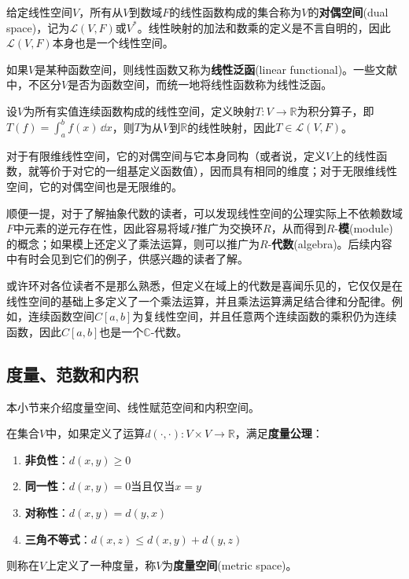 \begin{definition}[对偶空间]
    给定线性空间$V$，所有从$V$到数域$F$的线性函数构成的集合称为$V$的\textbf{对偶空间}(dual space)，记为$\mathcal{L}(V,F)$或$V^*$。线性映射的加法和数乘的定义是不言自明的，因此$\mathcal{L}(V,F)$本身也是一个线性空间。

    如果$V$是某种函数空间，则线性函数又称为\textbf{线性泛函}(linear functional)。一些文献中，不区分$V$是否为函数空间，而统一地将线性函数称为线性泛函。
\end{definition}
\begin{example}
    设$V$为所有实值连续函数构成的线性空间，定义映射$T:V\to \mathbb{R}$为积分算子，即$T(f)=\int_{a}^{b}f(x)\,\dd x$，则$T$为从$V$到$\mathbb{R}$的线性映射，因此$T\in \mathcal{L}(V,F)$。
\end{example}

对于有限维线性空间，它的对偶空间与它本身同构（或者说，定义$V$上的线性函数，就等价于对它的一组基定义函数值），因而具有相同的维度；对于无限维线性空间，它的对偶空间也是无限维的。

顺便一提，对于了解抽象代数的读者，可以发现线性空间的公理实际上不依赖数域$F$中元素的逆元存在性，因此容易将域$F$推广为交换环$R$，从而得到$R$-\textbf{模}(module)的概念；如果模上还定义了乘法运算，则可以推广为$R$-\textbf{代数}(algebra)。后续内容中有时会见到它们的例子，供感兴趣的读者了解。

\begin{example}
    或许环对各位读者不是那么熟悉，但定义在域上的代数是喜闻乐见的，它仅仅是在线性空间的基础上多定义了一个乘法运算，并且乘法运算满足结合律和分配律。例如，连续函数空间$C[a,b]$为复线性空间，并且任意两个连续函数的乘积仍为连续函数，因此$C[a,b]$也是一个$\mathbb{C}$-代数。
\end{example}

\subsection{度量、范数和内积}\label{sub:measurement}

本小节来介绍度量空间、线性赋范空间和内积空间\cite{linear_algebra}。
\begin{definition}[度量]
    在集合$V$中，如果定义了运算$d(\cdot,\cdot):V\times V\rightarrow \mathbb{R}$，满足\textbf{度量公理}：
    \begin{enumerate}
        \item \textbf{非负性}：$d(x, y) \geq 0$
        \item \textbf{同一性}：$d(x, y) = 0$当且仅当$x = y$
        \item \textbf{对称性}：$d(x, y) = d(y, x)$
        \item \textbf{三角不等式}：$d(x, z) \leq d(x, y) + d(y, z)$
    \end{enumerate}
    则称在$V$上定义了一种度量，称$V$为\textbf{度量空间}(metric space)。
\end{definition}

